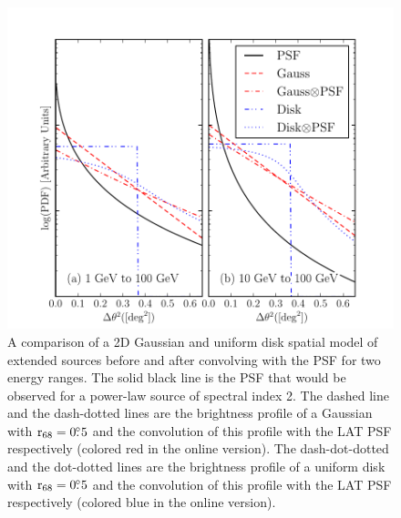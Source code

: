 \begin{figure}[htbp]
  \includegraphics{chapters/extended_analysis/figures/mc_plots/compare_disk_gauss_color.pdf}
  \caption{
  A comparison of a 2D Gaussian and uniform disk spatial model
  of extended sources before and after convolving with the PSF for two
  energy ranges.  The solid black line is the PSF that would be observed
  for a power-law source of spectral index 2. The dashed line
  and the dash-dotted lines are 
  the brightness profile of a Gaussian with ${\mathrm{r}_{68}}=0\mbox{$.\!\!^\circ$}5$
  and the convolution of this profile with the LAT PSF respectively
  (colored red in the online version).
  The dash-dot-dotted and the dot-dotted lines are the brightness profile
  of a uniform disk with ${\mathrm{r}_{68}}=0\mbox{$.\!\!^\circ$}5$ and the convolution
  of this profile with the LAT PSF respectively (colored blue in the online version).
  }
\end{figure}


